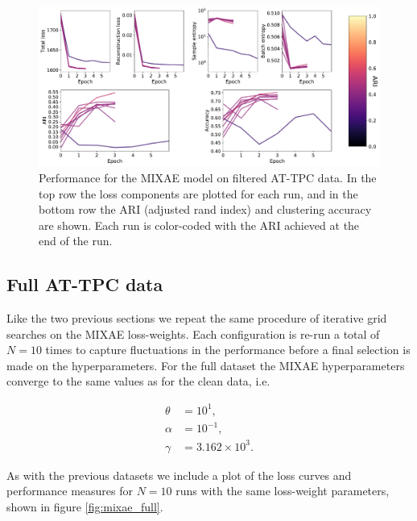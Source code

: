 \begin{figure}[H]
\centering
\includegraphics[width=\textwidth]{./plots/clean_mixae.pdf}
\caption{Performance for the MIXAE model on filtered AT-TPC data. In the top row the loss components are plotted for each run, and in the bottom row the ARI (adjusted rand index) and clustering accuracy are shown. Each run is color-coded with the ARI achieved at the end of the run.}\label{fig:mixae_clean}
\end{figure}


\subsection{Full AT-TPC data}

Like the two previous sections we repeat the same procedure of iterative grid searches on the MIXAE loss-weights. Each configuration is re-run a total of $N=10$ times to capture fluctuations in the performance before a final selection is made on the hyperparameters. For the full dataset the MIXAE hyperparameters converge to the same values as for the clean data, i.e. 


\begin{align}
\theta &= 10^{1}, \\
\alpha &= 10^{-1}, \\
\gamma &= 3.162\times 10^3.
\end{align}

\noindent As with the previous datasets we include a plot of the loss curves and performance measures for $N=10$ runs with the same loss-weight parameters, shown in figure \ref{fig:mixae_full}.

